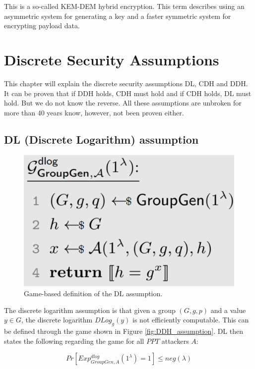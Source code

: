 This is a so-called KEM-DEM hybrid encryption.
This term describes using an asymmetric system for generating a key and a faster symmetric system for encrypting payload data.


\section{Discrete Security Assumptions}

This chapter will explain the discrete security assumptions DL, CDH and DDH.
It can be proven that if DDH holds, CDH must hold and if CDH holds, DL must hold.
But we do not know the reverse.
All these assumptions are unbroken for more than 40 years know, however, not been proven either.

\subsection{DL (Discrete Logarithm) assumption}

\begin{figure}
    \center
    \includegraphics[width=\linewidth]{gfx/discrete_log_assumption.png}
    \caption{Game-based definition of the DL assumption.}
    \label{fig:DL_assumption}
\end{figure}

The discrete logarithm assumption is that given a group $(G,g,p)$ and a value $y \in G$, the discrete logarithm $DLog_g(y)$ is not efficiently computable.
This can be defined through the game shown in Figure \ref{fig:DDH_assumption}.
DL then states the following regarding the game for all $PPT$ attackers $A$:

$$
    Pr[Exp_{GroupGen,A}^{dlog}(1^\lambda) = 1] \leq neg(\lambda)
$$


